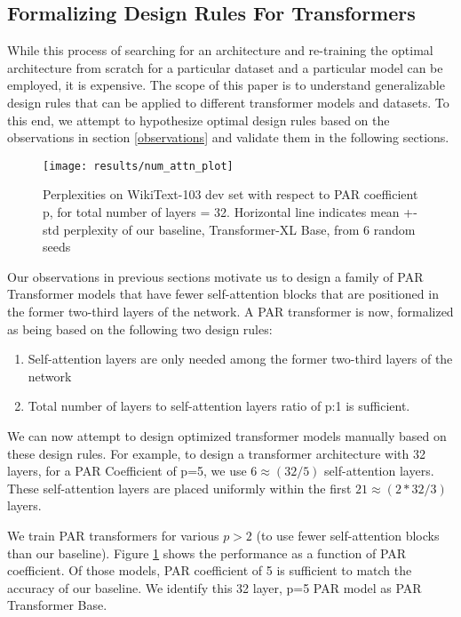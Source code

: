 \documentclass[11pt]{article}
\begin{document}
\subsection{Formalizing Design Rules For Transformers} \label{design_rules}

While this process of searching for an architecture and re-training the optimal architecture from scratch for a particular dataset and a particular model can be employed, it is expensive. The scope of this paper is to understand generalizable design rules that can be applied to different transformer models and datasets. To this end, we attempt to hypothesize optimal design rules based on the observations in section \ref{observations} and validate them in the following sections. 

\begin{figure}
\centering
\texttt{[image: results/num\_attn\_plot]}
\caption{Perplexities on WikiText-103 dev set with respect to PAR coefficient p, for total number of layers = 32. Horizontal line indicates mean +- std perplexity of our baseline, Transformer-XL Base, from 6 random seeds}
\label{fig:num_attn_plot}
\end{figure}




Our observations in previous sections motivate us to design a family of PAR Transformer models that have fewer self-attention blocks that are positioned in the former two-third layers of the network. A PAR transformer is now, formalized as being based on the following two design rules: 

\begin{enumerate}
    \item Self-attention layers are only needed among the former two-third layers of the network
    \item Total number of layers to self-attention layers ratio of p:1 is sufficient.
\end{enumerate}

We can now attempt to design optimized transformer models manually based on these design rules. For example, to design a transformer architecture with 32 layers, for a PAR Coefficient of p=5, we use $6 \approx (32/5)$ self-attention layers. These self-attention layers are placed uniformly within the first $21 \approx (2 * 32 / 3)$ layers. 

We train PAR transformers for various $p > 2$ (to use fewer self-attention blocks than our baseline). Figure \ref{fig:num_attn_plot} shows the performance as a function of PAR coefficient. Of those models, PAR coefficient of 5 is sufficient to match the accuracy of our baseline. We identify this 32 layer, p=5 PAR model as PAR Transformer Base.
\end{document}
